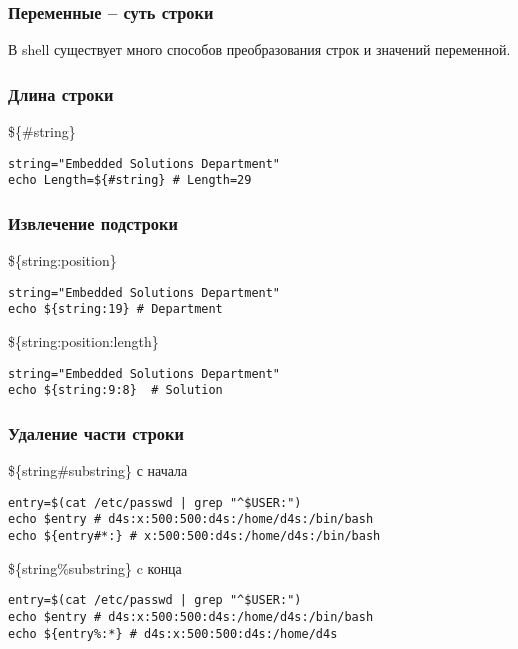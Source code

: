 

\begin{frame}
	\frametitle{Переменные -- суть строки}

	\begin{center}
	В shell существует много способов преобразования строк и значений переменной.
	\end{center}

\end{frame}


\begin{frame}[fragile]
	\frametitle{Длина строки}

	\begin{block}{\$\{\#string\}}
	\begin{lstlisting}
string="Embedded Solutions Department"
echo Length=${#string} # Length=29
	\end{lstlisting}
	\end{block}

\end{frame}


\begin{frame}[fragile]
	\frametitle{Извлечение подстроки}

	\begin{block}{\$\{string:position\}}
	\begin{lstlisting}
string="Embedded Solutions Department"
echo ${string:19} # Department
	\end{lstlisting}
	\end{block}

	\pause
	\begin{block}{\$\{string:position:length\}}
	\begin{lstlisting}
string="Embedded Solutions Department"
echo ${string:9:8}  # Solution
	\end{lstlisting}
	\end{block}

\end{frame}

\begin{frame}[fragile]
	\frametitle{Удаление части строки}

	\begin{block}{\$\{string\#substring\} с начала}
	\begin{lstlisting}
entry=$(cat /etc/passwd | grep "^$USER:")
echo $entry # d4s:x:500:500:d4s:/home/d4s:/bin/bash
echo ${entry#*:} # x:500:500:d4s:/home/d4s:/bin/bash
	\end{lstlisting}
	\end{block}

	\pause

	\begin{block}{\$\{string\%substring\} c конца}
	\begin{lstlisting}
entry=$(cat /etc/passwd | grep "^$USER:")
echo $entry # d4s:x:500:500:d4s:/home/d4s:/bin/bash
echo ${entry%:*} # d4s:x:500:500:d4s:/home/d4s 
	\end{lstlisting}
	\end{block}



\end{frame}

